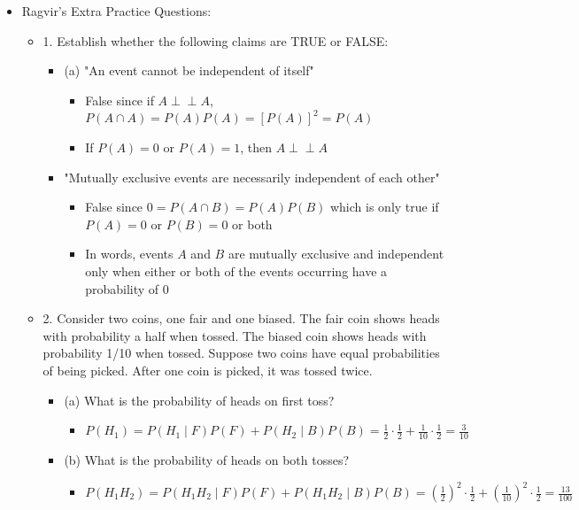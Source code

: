 \documentclass{article}
\newcommand{\indep}{\perp\!\!\!\perp}
\begin{document}
\begin{itemize}
\begin{itemize}
    \end{itemize}
    \item Ragvir's Extra Practice Questions:
    \begin{itemize}
        \item 1. Establish whether the following claims are TRUE or FALSE:
        \begin{itemize}
            \item (a) "An event cannot be independent of itself"
            \begin{itemize}
                \item False since if $A \indep A$, $P(A \cap A) = P(A)P(A) = [P(A)]^2=P(A)$
                \item If $P(A)=0$ or $P(A)=1$, then $A \indep A$
            \end{itemize}
            \item "Mutually exclusive events are necessarily independent of each other"
            \begin{itemize}
                \item False since $0 = P(A \cap B) = P(A)P(B)$ which is only true if $P(A) = 0$ or $P(B) = 0$ or both
                \item In words, events $A$ and $B$ are mutually exclusive and independent only when either or both of the events occurring have a probability of $0$
            \end{itemize}
        \end{itemize}
        \item 2. Consider two coins, one fair and one biased. The fair coin shows heads with probability a half when tossed. The biased coin shows heads with probability 1/10 when tossed. Suppose two coins have equal probabilities of being picked. After one coin is picked, it was tossed twice.
        \begin{itemize}
            \item (a) What is the probability of heads on first toss?
            \begin{itemize}
                \item $P(H_1) = P(H_1 \mid F) P(F) + P(H_2 \mid B) P(B) = \frac{1}{2} \cdot \frac{1}{2} + \frac{1}{10} \cdot \frac{1}{2} = \frac{3}{10}$
            \end{itemize}
            \item (b) What is the probability of heads on both tosses?
            \begin{itemize}
                \item $P(H_1H_2) = P(H_1H_2 \mid F)P(F) + P(H_1H_2 \mid B)P(B) = \left(\frac{1}{2}\right)^2 \cdot \frac{1}{2} + \left(\frac{1}{10}\right)^2 \cdot \frac{1}{2} = \frac{13}{100}$

\end{itemize}
\end{itemize}
\end{itemize}
\end{itemize}
\end{document}
